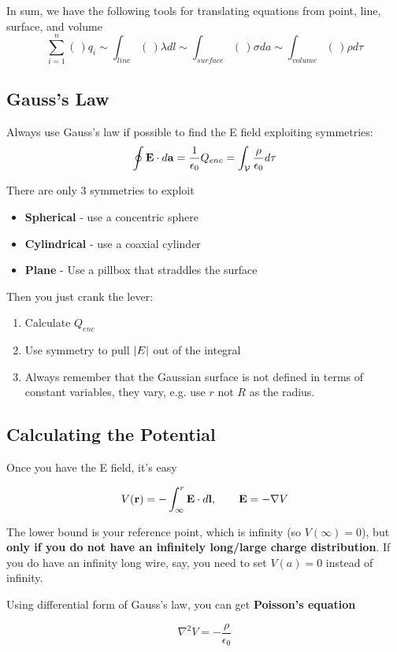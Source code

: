 \documentclass{article}
\begin{document}
In sum, we have the following tools for translating equations from point, line, surface, and volume
$$
\sum_{i=1}^n (\,)q_i \sim \int_{line} (\,)\lambda dl \sim \int_{surface} (\,) \sigma da \sim \int_{volume} (\,) \rho d\tau
$$

\subsection{Gauss's Law}
Always use Gauss's law if possible to find the E field exploiting symmetries:
$$
\oint \vb{E} \cdot d\vb{a} = \frac{1}{\epsilon_0} Q_{enc} = \int_\mathcal{V} \frac{\rho}{\epsilon_0} d\tau
$$

There are only 3 symmetries to exploit
\begin{itemize}
    \item \textbf{Spherical} - use a concentric sphere
    \item \textbf{Cylindrical} - use a coaxial cylinder
    \item \textbf{Plane} - Use a pillbox that straddles the surface
\end{itemize}

Then you just crank the lever:
\begin{enumerate}
    \item Calculate $Q_{enc}$
    \item Use symmetry to pull $\abs{E}$ out of the integral 
    \item Always remember that the Gaussian surface is not defined in terms of constant variables, they vary, e.g. use $r$ not $R$ as the radius.
\end{enumerate}

\subsection{Calculating the Potential}
Once you have the E field, it's easy 

$$
V(\vb{r}) = - \int_{\infty}^{r} \vb{E} \cdot d\vb{l}, \qquad \vb{E} = - \nabla V
$$

The lower bound is your reference point, which is infinity (so $V(\infty) = 0$), but \textbf{only if you do not have an infinitely long/large charge distribution}.  If you do have an infinity long wire, say, you need to set $V(a) = 0$ instead of infinity.

Using differential form of Gauss's law, you can get \textbf{Poisson's equation}

$$
\nabla^2 V = -\frac{\rho}{\epsilon_0}
$$
\end{document}
